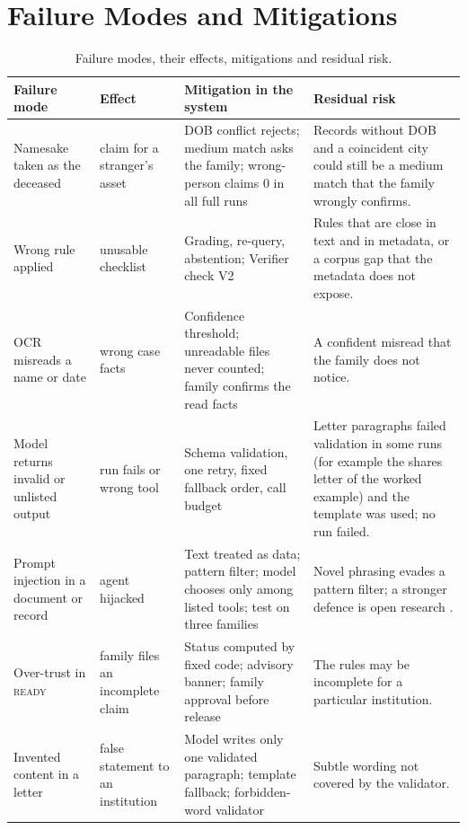 \documentclass[12pt,a4paper,oneside]{report}
\begin{document}
\section{Failure Modes and Mitigations}
\begin{table}[H]
\centering\footnotesize{}
\caption[Failure modes and mitigations]{Failure modes, their effects, mitigations and residual risk.}\label{tab:fmea}
\renewcommand{\arraystretch}{1.1}
\begin{tabularx}{\linewidth}{@{}p{2.5cm}p{2.7cm}p{3.7cm}X@{}}
\toprule
\textbf{Failure mode} & \textbf{Effect} & \textbf{Mitigation in the system} & \textbf{Residual risk} \\ \midrule
Namesake taken as the deceased & claim for a stranger's asset & DOB conflict rejects; medium match asks the family; wrong-person claims 0 in all full runs & Records without DOB and a coincident city could still be a medium match that the family wrongly confirms. \\
Wrong rule applied & unusable checklist & Grading, re-query, abstention; Verifier check V2 & Rules that are close in text and in metadata, or a corpus gap that the metadata does not expose. \\
OCR misreads a name or date & wrong case facts & Confidence threshold; unreadable files never counted; family confirms the read facts & A confident misread that the family does not notice. \\
Model returns invalid or unlisted output & run fails or wrong tool & Schema validation, one retry, fixed fallback order, call budget & Letter paragraphs failed validation in some runs (for example the shares letter of the worked example) and the template was used; no run failed. \\
Prompt injection in a document or record & agent hijacked & Text treated as data; pattern filter; model chooses only among listed tools; test on three families & Novel phrasing evades a pattern filter; a stronger defence is open research \cite{greshake2023}. \\
Over-trust in \textsc{ready} & family files an incomplete claim & Status computed by fixed code; advisory banner; family approval before release & The rules may be incomplete for a particular institution. \\
Invented content in a letter & false statement to an institution & Model writes only one validated paragraph; template fallback; forbidden-word validator & Subtle wording not covered by the validator. \\
\bottomrule
\end{tabularx}
\end{table}
\end{document}
